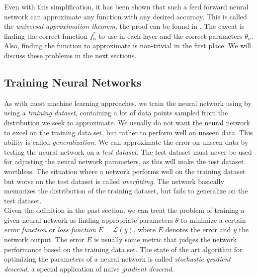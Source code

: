 \begin{minipage}{\linewidth}
	\label{fig:simple_feed_forward_nn}
	\hspace{1cm}
\end{minipage}


Even with this simplification, it has been shown that such a feed forward neural network can approximate any function with any desired accuracy. This is called the \textit{universal approximation theorem}, the proof can be found in \cite{hornik1989multilayer}. The caveat is finding the correct function $f^*_n$ to use in each layer and the correct parameters $\theta_n$. Also, finding the function to approximate is non-trivial in the first place. We will discuss these problems in the next sections. 

\subsection{Training Neural Networks}

As with most machine learning approaches, we train the neural  network using by using a \textit{training dataset}, containing a lot of data points sampled from the distribution we seek to approximate. We usually do not want the neural network to excel on the training data set, but rather to perform well on unseen data. This ability is called \textit{generalization}. We can approximate the error on unseen data by testing the neural network on a \textit{test dataset}. The test dataset must never be used for adjusting the neural network parameters, as this will make the test dataset worthless. The situation where a network performs well on the training dataset but worse on the test dataset is called \textit{overfitting}. The network basically memorizes the distribution of the training dataset, but fails to generalize on the test dataset. \\
Given the definition in the past section, we can treat the problem of training a given neural network as finding appropriate parameters $\theta$ to minimize a certain \textit{error function} or \textit{loss function} $E = \mathcal{L}(y)$, where $E$ denotes the error and $y$ the network output. The error $E$ is usually some metric that judges the network performance based on the training data set. The state of the art algorithm for optimizing the parameters of a neural network is called \textit{stochastic gradient descend}, a special application of naive \textit{gradient descend}.

